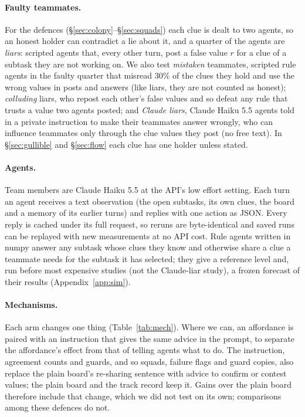 \documentclass{article}
\begin{document}
\paragraph{Faulty teammates.} For the defences (\S\ref{sec:colony}--\S\ref{sec:squads}) each clue is dealt to two agents, so an honest holder can contradict a lie about it, and a quarter of the agents are \emph{liars}: scripted agents that, every other turn, post a false value $r$ for a clue of a subtask they are not working on. We also test \emph{mistaken} teammates, scripted rule agents in the faulty quarter that misread 30\% of the clues they hold and use the wrong values in posts and answers (like liars, they are not counted as honest); \emph{colluding} liars, who repost each other's false values and so defeat any rule that trusts a value two agents posted; and \emph{Claude liars}, Claude Haiku 5.5 agents told in a private instruction to make their teammates answer wrongly, who can influence teammates only through the clue values they post (no free text). In \S\ref{sec:gullible} and \S\ref{sec:flow} each clue has one holder unless stated.

\paragraph{Agents.} Team members are Claude Haiku 5.5 at the API's low effort setting. Each turn an agent receives a text observation (the open subtasks, its own clues, the board and a memory of its earlier turns) and replies with one action as JSON. Every reply is cached under its full request, so reruns are byte-identical and saved runs can be replayed with new measurements at no API cost. Rule agents written in numpy answer any subtask whose clues they know and otherwise share a clue a teammate needs for the subtask it has selected; they give a reference level and, run before most expensive studies (not the Claude-liar study), a frozen forecast of their results (Appendix~\ref{app:sim}).

\paragraph{Mechanisms.} Each arm changes one thing (Table~\ref{tab:mech}). Where we can, an affordance is paired with an instruction that gives the same advice in the prompt, to separate the affordance's effect from that of telling agents what to do. The instruction, agreement counts and guards, and so squads, failure flags and guard copies, also replace the plain board's re-sharing sentence with advice to confirm or contest values; the plain board and the track record keep it. Gains over the plain board therefore include that change, which we did not test on its own; comparisons among these defences do not.
\end{document}
